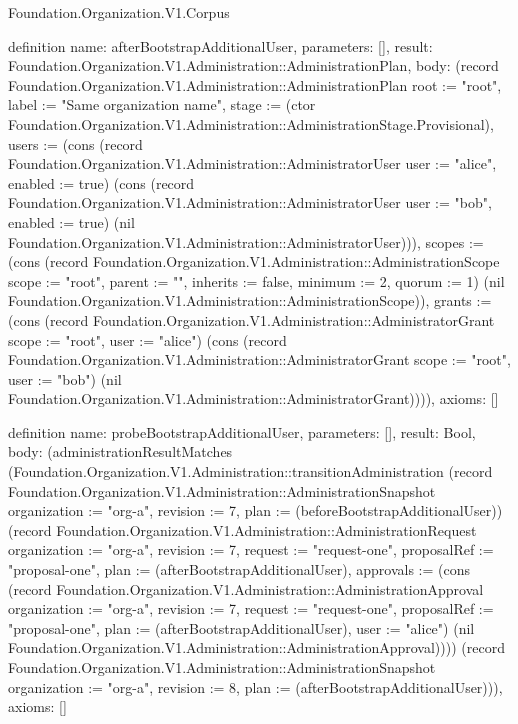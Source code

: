 \begin{lexlean}{Foundation.Organization.V1.Corpus}
\begin{semanticmodule}
definition{
  name: afterBootstrapAdditionalUser,
  parameters: [],
  result: Foundation.Organization.V1.Administration::AdministrationPlan,
  body: (record Foundation.Organization.V1.Administration::AdministrationPlan {root := "root", label := "Same organization name", stage := (ctor Foundation.Organization.V1.Administration::AdministrationStage.Provisional), users := (cons (record Foundation.Organization.V1.Administration::AdministratorUser {user := "alice", enabled := true}) (cons (record Foundation.Organization.V1.Administration::AdministratorUser {user := "bob", enabled := true}) (nil Foundation.Organization.V1.Administration::AdministratorUser))), scopes := (cons (record Foundation.Organization.V1.Administration::AdministrationScope {scope := "root", parent := "", inherits := false, minimum := 2, quorum := 1}) (nil Foundation.Organization.V1.Administration::AdministrationScope)), grants := (cons (record Foundation.Organization.V1.Administration::AdministratorGrant {scope := "root", user := "alice"}) (cons (record Foundation.Organization.V1.Administration::AdministratorGrant {scope := "root", user := "bob"}) (nil Foundation.Organization.V1.Administration::AdministratorGrant)))}),
  axioms: []
}

definition{
  name: probeBootstrapAdditionalUser,
  parameters: [],
  result: Bool,
  body: (administrationResultMatches (Foundation.Organization.V1.Administration::transitionAdministration (record Foundation.Organization.V1.Administration::AdministrationSnapshot {organization := "org-a", revision := 7, plan := (beforeBootstrapAdditionalUser)}) (record Foundation.Organization.V1.Administration::AdministrationRequest {organization := "org-a", revision := 7, request := "request-one", proposalRef := "proposal-one", plan := (afterBootstrapAdditionalUser), approvals := (cons (record Foundation.Organization.V1.Administration::AdministrationApproval {organization := "org-a", revision := 7, request := "request-one", proposalRef := "proposal-one", plan := (afterBootstrapAdditionalUser), user := "alice"}) (nil Foundation.Organization.V1.Administration::AdministrationApproval))})) (record Foundation.Organization.V1.Administration::AdministrationSnapshot {organization := "org-a", revision := 8, plan := (afterBootstrapAdditionalUser)})),
  axioms: []
}


\end{semanticmodule}
\end{lexlean}

